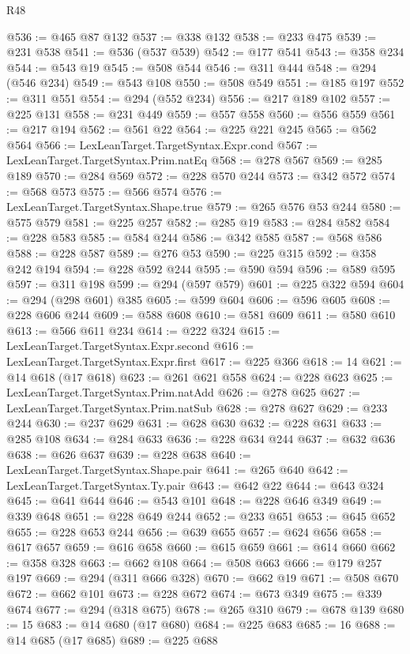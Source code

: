 \begin{lexlean}{R48}
\begin{coremodule}
@536 := @465 @87 @132
@537 := @338 @132
@538 := @233 @475
@539 := @231 @538
@541 := @536 (@537 @539)
@542 := @177 @541
@543 := @358 @234
@544 := @543 @19
@545 := @508 @544
@546 := @311 @444
@548 := @294 (@546 @234)
@549 := @543 @108
@550 := @508 @549
@551 := @185 @197
@552 := @311 @551
@554 := @294 (@552 @234)
@556 := @217 @189 @102
@557 := @225 @131
@558 := @231 @449
@559 := @557 @558
@560 := @556 @559
@561 := @217 @194
@562 := @561 @22
@564 := @225 @221 @245
@565 := @562 @564
@566 := LexLeanTarget.TargetSyntax.Expr.cond
@567 := LexLeanTarget.TargetSyntax.Prim.natEq
@568 := @278 @567
@569 := @285 @189
@570 := @284 @569
@572 := @228 @570 @244
@573 := @342 @572
@574 := @568 @573
@575 := @566 @574
@576 := LexLeanTarget.TargetSyntax.Shape.true
@579 := @265 @576 @53 @244
@580 := @575 @579
@581 := @225 @257
@582 := @285 @19
@583 := @284 @582
@584 := @228 @583
@585 := @584 @244
@586 := @342 @585
@587 := @568 @586
@588 := @228 @587
@589 := @276 @53
@590 := @225 @315
@592 := @358 @242 @194
@594 := @228 @592 @244
@595 := @590 @594
@596 := @589 @595
@597 := @311 @198
@599 := @294 (@597 @579)
@601 := @225 @322 @594
@604 := @294 (@298 @601) @385
@605 := @599 @604
@606 := @596 @605
@608 := @228 @606 @244
@609 := @588 @608
@610 := @581 @609
@611 := @580 @610
@613 := @566 @611 @234
@614 := @222 @324
@615 := LexLeanTarget.TargetSyntax.Expr.second
@616 := LexLeanTarget.TargetSyntax.Expr.first
@617 := @225 @366
@618 := 14
@621 := @14 @618 (@17 @618)
@623 := @261 @621 @558
@624 := @228 @623
@625 := LexLeanTarget.TargetSyntax.Prim.natAdd
@626 := @278 @625
@627 := LexLeanTarget.TargetSyntax.Prim.natSub
@628 := @278 @627
@629 := @233 @244
@630 := @237 @629
@631 := @628 @630
@632 := @228 @631
@633 := @285 @108
@634 := @284 @633
@636 := @228 @634 @244
@637 := @632 @636
@638 := @626 @637
@639 := @228 @638
@640 := LexLeanTarget.TargetSyntax.Shape.pair
@641 := @265 @640
@642 := LexLeanTarget.TargetSyntax.Ty.pair
@643 := @642 @22
@644 := @643 @324
@645 := @641 @644
@646 := @543 @101
@648 := @228 @646 @349
@649 := @339 @648
@651 := @228 @649 @244
@652 := @233 @651
@653 := @645 @652
@655 := @228 @653 @244
@656 := @639 @655
@657 := @624 @656
@658 := @617 @657
@659 := @616 @658
@660 := @615 @659
@661 := @614 @660
@662 := @358 @328
@663 := @662 @108
@664 := @508 @663
@666 := @179 @257 @197
@669 := @294 (@311 @666 @328)
@670 := @662 @19
@671 := @508 @670
@672 := @662 @101
@673 := @228 @672
@674 := @673 @349
@675 := @339 @674
@677 := @294 (@318 @675)
@678 := @265 @310
@679 := @678 @139
@680 := 15
@683 := @14 @680 (@17 @680)
@684 := @225 @683
@685 := 16
@688 := @14 @685 (@17 @685)
@689 := @225 @688

\end{coremodule}
\end{lexlean}
